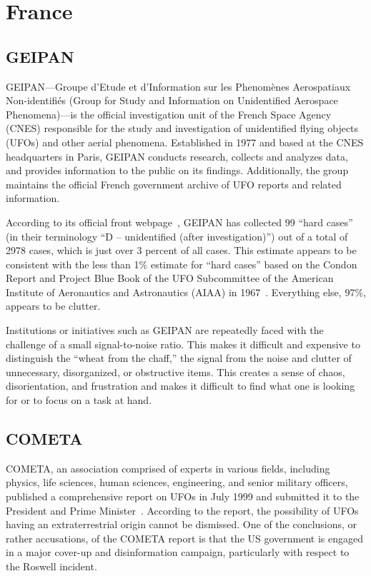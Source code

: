 \section{France}
\label{2023-UFO-part-Perception-types-France}

\subsection{GEIPAN}

GEIPAN---Groupe d'Etude et d'Information sur les Phenom\`enes Aerospatiaux Non-identifi\'es
(Group for Study and Information on Unidentified Aerospace Phenomena)---is the official investigation unit of the
French Space Agency (CNES) responsible for the study and investigation of unidentified flying objects (UFOs) and other aerial phenomena. Established in 1977 and based at the CNES headquarters in Paris, GEIPAN conducts research, collects and analyzes data, and provides information to the public on its findings. Additionally, the group maintains the official French government archive of UFO reports and related information.

According to its official front webpage~\cite{Geipan}, GEIPAN has collected 99 ``hard cases'' (in their terminology ``D --
unidentified (after investigation)'') out of a total of 2978 cases, which is just over 3 percent of all cases.
This estimate appears to be consistent with the less than 1{\%}
estimate for ``hard cases'' based on the Condon Report and Project Blue Book of the UFO
Subcommittee of the American Institute of Aeronautics and Astronautics (AIAA) in 1967~\cite{AA-Condon-1970}. Everything else, 97{\%}, appears to be clutter.

Institutions or initiatives such as GEIPAN are repeatedly faced with the challenge of a small signal-to-noise ratio. This makes it difficult and expensive to distinguish the ``wheat from the chaff,'' the signal from the noise and clutter of unnecessary, disorganized, or obstructive items. This creates a sense of chaos, disorientation, and frustration and makes it difficult to find what one is looking for or to focus on a task at hand.

\subsection{COMETA}


COMETA, an association comprised of experts in various fields, including physics, life sciences, human sciences, engineering, and senior military officers, published a comprehensive report on UFOs in July 1999 and submitted it to the President and Prime Minister~\cite{COMETA2003Jun,COMETA-English}. According to the report, the possibility of UFOs having an extraterrestrial origin cannot be dismissed. One of the conclusions, or rather accusations, of the COMETA report is that the US government is engaged in a major cover-up and disinformation campaign, particularly with respect to the Roswell incident. 

